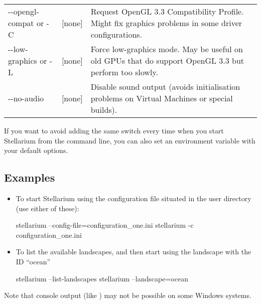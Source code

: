 \begin{longtable}{l|c|p{68mm}}
-\/-opengl-compat or -C & {[}none{]} & Request OpenGL 3.3 Compatibility Profile. Might fix graphics problems in some driver configurations.\\
-\/-low-graphics or -L & {[}none{]} & Force low-graphics mode. May be useful on old GPUs that do support OpenGL 3.3 but perform too slowly.\\\midrule
-\/-no-audio          & {[}none{]} & Disable sound output (avoids initialisation problems on Virtual Machines or special builds).\\
\bottomrule
\end{longtable}

\noindent {} If you want to avoid adding the same
switch every time when you start Stellarium from the command line, you
can also set an environment variable  with your
default options. 

\subsection{Examples}
\label{sec:CommandLineOptions:Examples}

\begin{itemize}
\item To start Stellarium using the configuration file
   situated in the user directory (use either of
  these):

\begin{commands}
stellarium --config-file=configuration_one.ini
stellarium -c configuration_one.ini
\end{commands}

\item To list the available landscapes, and then start using the
  landscape with the ID ``ocean''
\begin{commands}
stellarium --list-landscapes 
stellarium --landscape=ocean
\end{commands}
\end{itemize}

\noindent Note that console output (like ) may not be possible on some Windows systems. 

%



